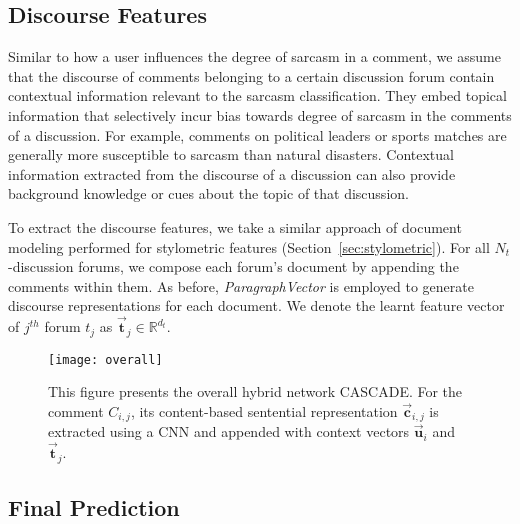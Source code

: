 \documentclass[11pt]{article}
\begin{document}
{\subsection{Discourse Features} \label{sec:discourse}

Similar to how a user influences the degree of sarcasm in a comment, we assume that the discourse of  comments belonging to a certain discussion forum contain contextual information relevant to the sarcasm classification. They embed topical information that selectively incur bias towards degree of sarcasm in the comments of a discussion. For example, comments on political leaders or sports matches are generally more susceptible to sarcasm than natural disasters. Contextual information extracted from the discourse of a discussion can also provide background knowledge or cues about the topic of that discussion.

To extract the discourse features, we take a similar approach of document modeling performed for stylometric features (Section~\ref{sec:stylometric}). For all $N_t$-discussion forums, we compose each forum's document by appending the comments within them. As before, \textit{ParagraphVector} is employed to generate discourse representations for each document. We denote the learnt feature vector of $j^{th}$ forum $t_j$ as $\vec{\bm{t}}_{j} \in \mathbb{R}^{d_t}$.

\begin{figure}[t] 
	\centering 
	\texttt{[image: overall]}   
	\caption[]{\footnotesize This figure presents the overall hybrid network CASCADE. For the comment $C_{i,j}$, its content-based sentential representation $\vec{\bm{c}}_{i,j}$ is extracted using a CNN and appended with context vectors   $\vec{\bm{u}}_{i}$ and $\vec{\bm{t}}_{j}$.}
	\label{fig:overall}
    \vspace{-0.3cm}
\end{figure}

    
\subsection{Final Prediction} \label{sec:prediction}

}
\end{document}
